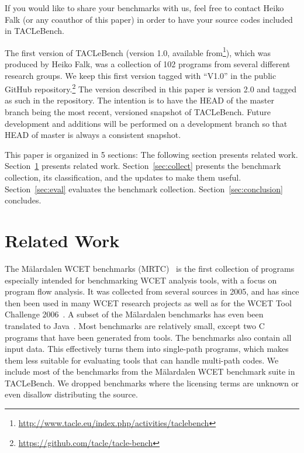 \documentclass[a4paper,UKenglish]{oasics}
\begin{document}
If you would like to share your  benchmarks with us,
feel free to contact Heiko Falk (or any coauthor of this paper) in order
to have your source codes included in TACLeBench.

The first version of TACLeBench (version 1.0, available
from\footnote{\url{http://www.tacle.eu/index.php/activities/taclebench}}), which was produced
by Heiko Falk, was a collection of 102 programs from several different
research groups. We keep this first version tagged with ``V1.0'' in the public
GitHub repository.\footnote{\url{https://github.com/tacle/tacle-bench}}
The version described in this paper is version 2.0 and tagged as such in the
repository.
The intention is to have the HEAD of the master branch being
the most recent, versioned snapshot of TACLeBench.
Future development and additions will be performed on a development
branch so that HEAD of master is always a consistent snapshot.

This paper is organized in 5 sections: The following section presents related work.
Section~\ref{sec:related} presents related work.
Section~\ref{sec:collect} presents the benchmark collection, its classification, and the updates
to make them useful.
Section~\ref{sec:eval} evaluates the benchmark collection.
Section~\ref{sec:conclusion} concludes.

\section{Related Work}
\label{sec:related}

The M{\"a}lardalen WCET benchmarks (MRTC)~\cite{wcet:bench:2012} is the first collection of programs especially
intended for benchmarking WCET analysis tools, with a focus on program flow analysis.
It was collected from several sources in 2005, and has since then been
used in many WCET research projects as well as for the WCET Tool Challenge 2006~\cite{Gustafsson:ISOLA2006}.
A subset of the M{\"a}lardalen benchmarks has even been translated to
Java~\cite{jop:volta:rtas2008}. Most benchmarks are relatively small, except
two C programs that have been generated from tools.
The benchmarks also contain all input data. This effectively turns them into single-path programs, which
makes them less suitable for evaluating tools that can handle multi-path codes.
We include most of the benchmarks from the
M{\"a}lardalen WCET benchmark suite in TACLeBench.
We dropped benchmarks where the licensing terms are unknown
or even disallow distributing the source.
\end{document}
